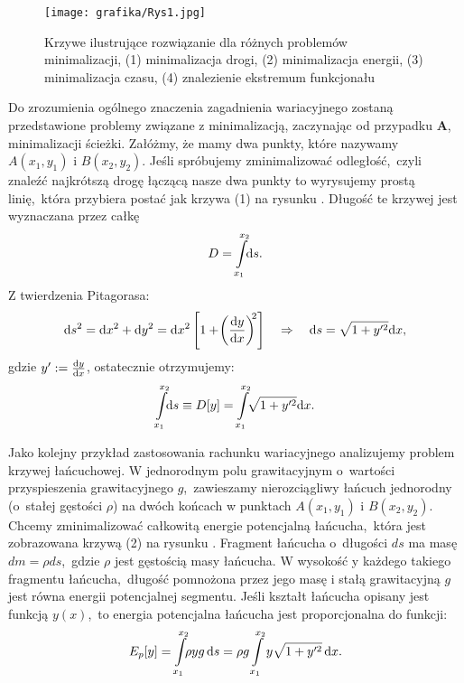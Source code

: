 \begin{figure}[htb]
    \centering
    \texttt{[image: grafika/Rys1.jpg]}
    \caption{\label{fig:Minimalizacja} Krzywe ilustrujące rozwiązanie dla różnych problemów minimalizacji, (1) minimalizacja drogi, (2) minimalizacja energii, (3) minimalizacja czasu, (4) znalezienie ekstremum funkcjonału}
\end{figure}
\indent Do zrozumienia ogólnego znaczenia zagadnienia wariacyjnego zostaną przedstawione problemy związane z minimalizacją, zaczynając od przypadku {\bf A}, minimalizacji ścieżki. Załóżmy, że mamy dwa punkty, które nazywamy $A(x_1,y_1)$ i $B(x_2,y_2)$. Jeśli spróbujemy zminimalizować odległość,~czyli znaleźć najkrótszą drogę łączącą nasze dwa punkty to wyrysujemy prostą linię,~która przybiera postać jak krzywa (1) na rysunku . Długość te krzywej jest wyznaczana przez całkę
%
$$D = \int\limits_{x_1}^{x_2}\!\! {\rm d}{s}.$$
%
\newpage
Z twierdzenia Pitagorasa:
%
$${\rm d}{s}^2 = {\rm d}{x}^2 + {\rm d}{y}^2 = {\rm d}{x}^2 \left[{1+\!\left(\frac{{\rm d}{y}}{{\rm d}{x}}\right)^{\!\!2}}\right]\quad \Rightarrow\quad {\rm d}{s} = \sqrt{1+y'^2} {\rm d}{x},$$ gdzie $y':= \frac{{\rm d}{y}}{{\rm d}{x}}$, 
%
ostatecznie otrzymujemy:
%
$$\int\limits_{x_1}^{x_2}\!\!{\rm d}{s} \equiv D[y]  = \int\limits_{x_1}^{x_2}\!\!\sqrt{1+y'^2} {\rm d}{x}.$$
%

  Jako kolejny przykład zastosowania rachunku wariacyjnego analizujemy problem krzywej łańcuchowej. W jednorodnym polu grawitacyjnym o~wartości przyspieszenia grawitacyjnego $g$,~zawieszamy nierozciągliwy łańcuch jednorodny (o~stałej gęstości $\rho$) na dwóch końcach w punktach $A(x_1,y_1)$ i $B(x_2,y_2)$. Chcemy zminimalizować całkowitą energie potencjalną łańcucha,~która jest zobrazowana krzywą (2) na rysunku . Fragment łańcucha o~długości $ds$ ma masę $dm = \rho ds$,~gdzie $\rho$ jest gęstością masy łańcucha. W wysokość y każdego takiego fragmentu łańcucha,~długość pomnożona przez jego masę i stałą grawitacyjną $g$ jest równa energii potencjalnej segmentu. Jeśli kształt łańcucha opisany jest funkcją $y(x)$,~to energia potencjalna łańcucha jest proporcjonalna do funkcji:
%
$$E_p[y]=\int\limits_{x_1}^{x_2}\!\!\rho y g\, {\rm d}{s} = \rho g \int\limits_{x_1}^{x_2}y\sqrt{1+y'^2}\, {\rm d}{x}.$$
%

